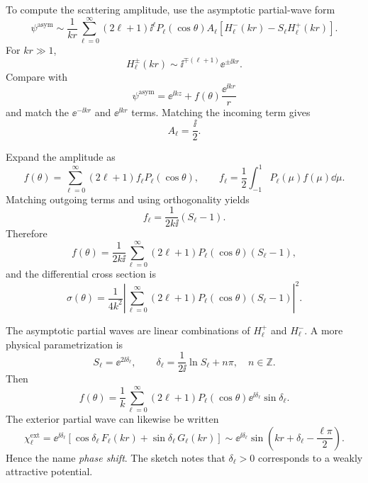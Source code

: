 To compute the scattering amplitude, use the asymptotic partial-wave form
\[
  \psi^{\mathrm{asym}}
  \sim \frac{1}{kr}\sum_{\ell=0}^{\infty}(2\ell+1)\ii^\ell
  P_\ell(\cos\theta)A_\ell
  \left[H_\ell^-(kr)-S_\ell H_\ell^+(kr)\right].
\]
For $kr\gg1$,
\[
  H_\ell^\pm(kr)\sim \ii^{\mp(\ell+1)}\ee^{\pm\ii kr}.
\]
Compare with
\[
  \psi^{\mathrm{asym}}=\ee^{\ii kz}+f(\theta)\frac{\ee^{\ii kr}}{r}
\]
and match the $\ee^{-\ii kr}$ and $\ee^{\ii kr}$ terms.  Matching the incoming term gives
\[
  A_\ell=\frac{\ii}{2}.
\]

Expand the amplitude as
\[
  f(\theta)=\sum_{\ell=0}^{\infty}(2\ell+1)f_\ell P_\ell(\cos\theta),
  \qquad
  f_\ell=\frac12\int_{-1}^{1}P_\ell(\mu)f(\mu)\dd\mu.
\]
Matching outgoing terms and using orthogonality yields
\begin{equation}
  f_\ell=\frac{1}{2k\ii}(S_\ell-1).
  \label{eq:ns2-fl}
\end{equation}
Therefore
\begin{equation}
  f(\theta)=\frac{1}{2k\ii}
  \sum_{\ell=0}^{\infty}(2\ell+1)P_\ell(\cos\theta)(S_\ell-1),
  \label{eq:ns2-f-S}
\end{equation}
and the differential cross section is
\begin{equation}
  \sigma(\theta)
  =\frac{1}{4k^2}
  \left|\sum_{\ell=0}^{\infty}(2\ell+1)P_\ell(\cos\theta)(S_\ell-1)\right|^2.
  \label{eq:ns2-diff-xs-S}
\end{equation}

The asymptotic partial waves are linear combinations of $H_\ell^+$ and $H_\ell^-$.  A more physical parametrization is
\begin{equation}
  S_\ell=\ee^{2\ii\delta_\ell},
  \qquad
  \delta_\ell=\frac{1}{2\ii}\ln S_\ell+n\pi,
  \quad n\in\mathbb Z.
  \label{eq:ns2-phase-shift}
\end{equation}
Then
\begin{equation}
  f(\theta)=\frac{1}{k}
  \sum_{\ell=0}^{\infty}(2\ell+1)P_\ell(\cos\theta)
  \ee^{\ii\delta_\ell}\sin\delta_\ell.
  \label{eq:ns2-f-phase}
\end{equation}
The exterior partial wave can likewise be written
\[
  \chi_\ell^{\mathrm{ext}}
  =\ee^{\ii\delta_\ell}
  \left[\cos\delta_\ell\,F_\ell(kr)
  +\sin\delta_\ell\,G_\ell(kr)\right]
  \sim \ee^{\ii\delta_\ell}
  \sin\left(kr+\delta_\ell-\frac{\ell\pi}{2}\right).
\]
Hence the name \emph{phase shift}.  The sketch notes that $\delta_\ell>0$ corresponds to a weakly attractive potential.

